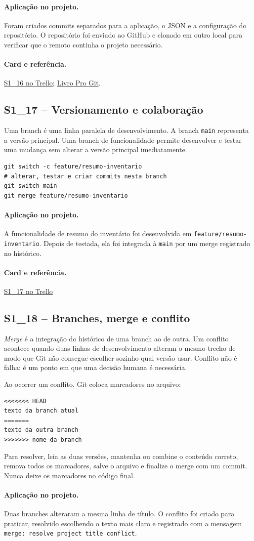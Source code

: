 \documentclass[11pt,a4paper]{article}
\newcommand{\projeto}{\paragraph{Aplicação no projeto.}}
\newcommand{\referencia}[2]{\paragraph{Card e referência.}\href{#1}{#2}}
\newcommand{\cardsection}[1]{\Needspace{12\baselineskip}\subsection{#1}}
\begin{document}
\projeto
Foram criados commits separados para a aplicação, o JSON e a configuração do repositório. O repositório foi enviado ao GitHub e clonado em outro local para verificar que o remoto continha o projeto necessário.

\referencia{https://trello.com/c/vUu4H8Bq}{S1\_16 no Trello}; \href{https://git-scm.com/book/pt-br/v2}{Livro Pro Git}.

\cardsection{S1\_17 -- Versionamento e colaboração}

Uma branch é uma linha paralela de desenvolvimento. A branch \texttt{main} representa a versão principal. Uma branch de funcionalidade permite desenvolver e testar uma mudança sem alterar a versão principal imediatamente.

\begin{lstlisting}[caption={Criar e integrar uma branch}]
git switch -c feature/resumo-inventario
# alterar, testar e criar commits nesta branch
git switch main
git merge feature/resumo-inventario
\end{lstlisting}

\projeto
A funcionalidade de resumo do inventário foi desenvolvida em \texttt{feature/resumo-inventario}. Depois de testada, ela foi integrada à \texttt{main} por um merge registrado no histórico.

\referencia{https://trello.com/c/Ec5uKKhf}{S1\_17 no Trello}

\cardsection{S1\_18 -- Branches, merge e conflito}

\emph{Merge} é a integração do histórico de uma branch ao de outra. Um conflito acontece quando duas linhas de desenvolvimento alteram o mesmo trecho de modo que Git não consegue escolher sozinho qual versão usar. Conflito não é falha: é um ponto em que uma decisão humana é necessária.

Ao ocorrer um conflito, Git coloca marcadores no arquivo:

\begin{lstlisting}
<<<<<<< HEAD
texto da branch atual
=======
texto da outra branch
>>>>>>> nome-da-branch
\end{lstlisting}

Para resolver, leia as duas versões, mantenha ou combine o conteúdo correto, remova todos os marcadores, salve o arquivo e finalize o merge com um commit. Nunca deixe os marcadores no código final.

\projeto
Duas branches alteraram a mesma linha de título. O conflito foi criado para praticar, resolvido escolhendo o texto mais claro e registrado com a mensagem \texttt{merge: resolve project title conflict}.
\end{document}
